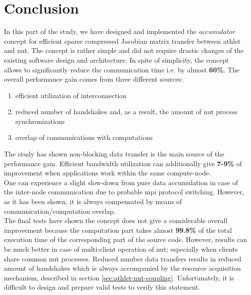 \section{Conclusion}
\label{sec:accumulator-conclusions}


In this part of the study, we have designed and implemented the \textit{accumulator} concept for efficient sparse compressed Jacobian matrix transfer between \acrshort{athlet} and \acrshort{nut}. The concept is rather simple and did not require drastic changes of the existing software design and architecture. In spite of simplicity, the concept allows to significantly reduce the communication time i.e. by almost \textbf{60\%}. The overall performance gain comes from three different sources: 

\begin{enumerate}
	\item efficient utilization of interconnection
	\item reduced number of handshakes and, as a result, the amount of \acrshort{nut} process synchronizations
	\item overlap of communications with computations
\end{enumerate}

The study has shown non-blocking data transfer is the main source of the performance gain. Efficient bandwidth utilization can additionally give \textbf{7-9\%} of improvement when applications work within the same compute-node.\\


One can experience a slight slow-down from pure data accumulation in case of the inter-node communication due to probable \acrshort{mpi} protocol switching. However, as it has been shown, it is always compensated by means of communication/computation overlap.\\


The final tests have shown the concept does not give a considerable overall improvement because the computation part takes almost \textbf{99.8\%} of the total execution time of the corresponding part of the source code. However, results can be much better in case of multi-client operation of \acrshort{nut}; especially when clients share common \acrshort{nut} processes. Reduced number data transfers results in reduced amount of handshakes which is always accompanied by the resource acquisition mechanism, described in section \ref{sec:athlet-nut-coupling}. Unfortunately, it is difficult to design and prepare valid tests to verify this statement. \\


